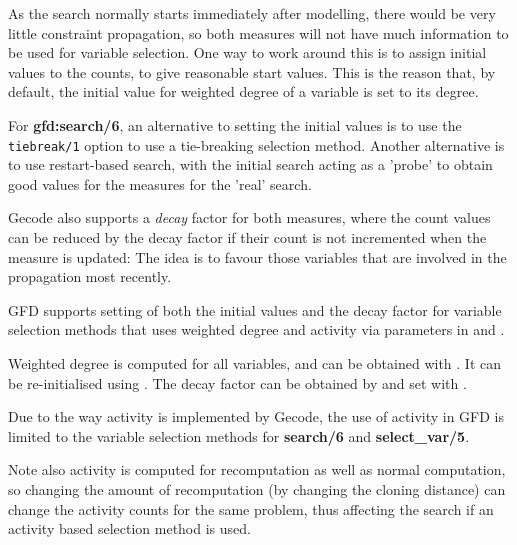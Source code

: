 As the search normally starts immediately after modelling, there would be
very little constraint propagation, so both measures
will not have much information to be used for variable selection.
One way to work around this is to assign initial
values to the counts, to give reasonable start values. This is the reason
that, by default, the initial value for weighted degree of a variable is set
to its degree. 

For {\bf gfd:search/6}, an alternative to setting the initial values is to
use the \texttt{tiebreak/1} option to use a tie-breaking
selection method. Another alternative is to use restart-based search, with
the initial search acting as a 'probe' to obtain good values for the measures
for the 'real' search.

Gecode also supports a {\it decay\/} factor for both measures, where the
count values can be reduced by the decay factor if their count is not 
incremented when the measure is updated: The idea is to favour those 
variables that are involved in the propagation most recently. 

GFD supports setting of both the initial values and the decay factor for
variable selection methods that uses weighted
degree and activity via parameters in
 and
. 

\begin{sloppypar}
Weighted degree is computed for all variables, and can be obtained with
. It can be re-initialised using 
. The decay factor can be obtained by
 and set with 
.
\end{sloppypar}

Due to the way activity is implemented by Gecode, the use of activity in GFD 
is limited to the variable selection methods for {\bf search/6} and 
{\bf select_var/5}.

Note also activity is computed for recomputation as well as normal computation,
so changing the amount of recomputation (by changing the cloning distance)
can change the activity counts for the same problem, thus affecting the
search if an activity based selection method is used.

